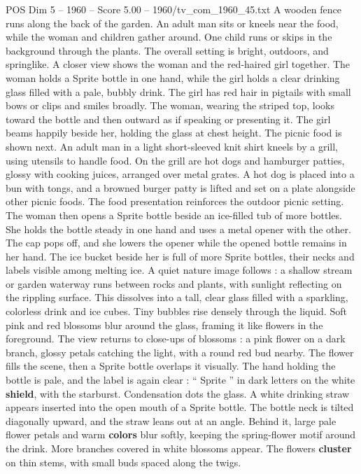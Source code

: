 \begin{textsample}{POS Dim 5 – 1960 – Score 5.00 – 1960/tv\_com\_1960\_45.txt}
A wooden fence runs along the back of the garden.
An adult man sits or kneels near the food, while the woman and children gather around.
One child runs or skips in the background through the plants.
The overall setting is bright, outdoors, and springlike.
A closer view shows the woman and the red-haired girl together.
The woman holds a Sprite bottle in one hand, while the girl holds a clear drinking glass filled with a pale, bubbly drink.
The girl has red hair in pigtails with small bows or clips and smiles broadly.
The woman, wearing the striped top, looks toward the bottle and then outward as if speaking or presenting it.
The girl beams happily beside her, holding the glass at chest height.
The picnic food is shown next.
An adult man in a light short-sleeved knit shirt kneels by a grill, using utensils to handle food.
On the grill are hot dogs and hamburger patties, glossy with cooking juices, arranged over metal grates.
A hot dog is placed into a bun with tongs, and a browned burger patty is lifted and set on a plate alongside other picnic foods.
The food presentation reinforces the outdoor picnic setting.
The woman then opens a Sprite bottle beside an ice-filled tub of more bottles.
She holds the bottle steady in one hand and uses a metal opener with the other.
The cap pops off, and she lowers the opener while the opened bottle remains in her hand.
The ice bucket beside her is full of more Sprite bottles, their necks and labels visible among melting ice.
A quiet nature image follows : a shallow stream or garden waterway runs between rocks and plants, with sunlight reflecting on the rippling surface.
This dissolves into a tall, clear glass filled with a sparkling, colorless drink and ice cubes.
Tiny bubbles rise densely through the liquid.
Soft pink and red blossoms blur around the glass, framing it like flowers in the foreground.
The view returns to close-ups of blossoms : a pink flower on a dark branch, glossy petals catching the light, with a round red bud nearby.
The flower fills the scene, then a Sprite bottle overlaps it visually.
The hand holding the bottle is pale, and the label is again clear : “ Sprite ” in dark letters on the white \textbf{shield}, with the starburst.
Condensation dots the glass.
A white drinking straw appears inserted into the open mouth of a Sprite bottle.
The bottle neck is tilted diagonally upward, and the straw leans out at an angle.
Behind it, large pale flower petals and warm \textbf{colors} blur softly, keeping the spring-flower motif around the drink.
More branches covered in white blossoms appear.
The flowers \textbf{cluster} on thin stems, with small buds spaced along the twigs.

\end{textsample}
